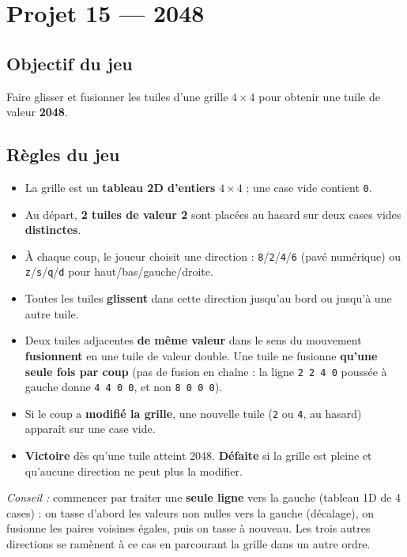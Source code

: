 \section{Projet 15 — 2048}

\subsection*{Objectif du jeu}
Faire glisser et fusionner les tuiles d'une grille $4\times4$ pour obtenir une tuile de valeur \textbf{2048}.

\subsection*{Règles du jeu}
\begin{itemize}
  \item La grille est un \textbf{tableau 2D d'entiers} $4\times4$ ; une case vide contient \texttt{0}.
  \item Au départ, \textbf{2 tuiles de valeur 2} sont placées au hasard sur deux cases vides \textbf{distinctes}.
  \item À chaque coup, le joueur choisit une direction : \texttt{8}/\texttt{2}/\texttt{4}/\texttt{6} (pavé numérique) ou \texttt{z}/\texttt{s}/\texttt{q}/\texttt{d} pour haut/bas/gauche/droite.
  \item Toutes les tuiles \textbf{glissent} dans cette direction jusqu'au bord ou jusqu'à une autre tuile.
  \item Deux tuiles adjacentes \textbf{de même valeur} dans le sens du mouvement \textbf{fusionnent} en une tuile de valeur double. Une tuile ne fusionne \textbf{qu'une seule fois par coup} (pas de fusion en chaîne : la ligne \texttt{2 2 4 0} poussée à gauche donne \texttt{4 4 0 0}, et non \texttt{8 0 0 0}).
  \item Si le coup a \textbf{modifié la grille}, une nouvelle tuile (\texttt{2} ou \texttt{4}, au hasard) apparaît sur une case vide.
  \item \textbf{Victoire} dès qu'une tuile atteint 2048. \textbf{Défaite} si la grille est pleine et qu'aucune direction ne peut plus la modifier.
\end{itemize}

\textit{Conseil :} commencer par traiter une \textbf{seule ligne} vers la gauche (tableau 1D de 4 cases) : on tasse d'abord les valeurs non nulles vers la gauche (décalage), on fusionne les paires voisines égales, puis on tasse à nouveau. Les trois autres directions se ramènent à ce cas en parcourant la grille dans un autre ordre.

